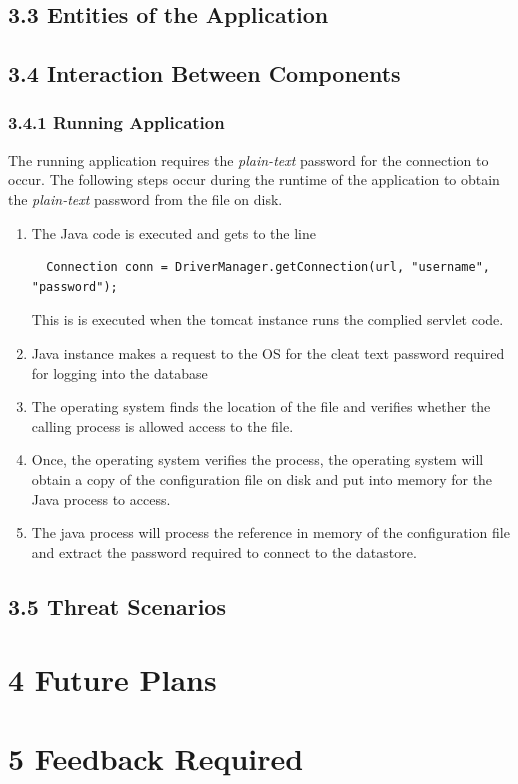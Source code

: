 \documentclass[11pt, a4paper, twoside, openright, notitlepage]{report}
\begin{document}
\subsection*{3.3 Entities of the Application}


\subsection*{3.4 Interaction Between Components}
\subsubsection*{3.4.1 Running Application}
The running application requires the \emph{plain-text} password for the connection to occur. The following steps occur during the runtime of the application to obtain the \emph{plain-text} password from the file on disk. 

\begin{enumerate}
\item The Java code is executed and gets to the line
\begin{lstlisting}
  Connection conn = DriverManager.getConnection(url, "username", "password");
\end{lstlisting}
This is is executed when the tomcat instance runs the complied servlet code.
\item Java instance makes a request to the OS for the cleat text password required for logging into the database
\item The operating system finds the location of the file and verifies whether the calling process is allowed access to the file.
\item Once, the operating system verifies the process, the operating system will obtain a copy of the configuration file on disk and put into memory for the Java process to access.
\item The java process will process the reference in memory of the configuration file and extract the password required to connect to the datastore.
\end{enumerate}





\subsection*{3.5 Threat Scenarios}





\section*{4 Future Plans}





\section*{5 Feedback Required}






\backmatter


%

\end{document}
